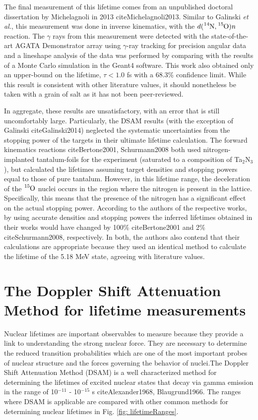 The final measurement of this lifetime comes from an unpublished doctoral dissertation by Michelagnoli in 2013 cite{Michelagnoli2013}. Similar to Galinski \textit{et al.}, this measurement was done in inverse kinematics, with the $d(\ce{^{14}N},\ce{^{15}O})n$ reaction. The $\gamma$ rays from this measurement were detected with the state-of-the-art AGATA Demonstrator array using $\gamma$-ray tracking for precision angular data and a lineshape analysis of the data was performed by comparing with the results of a Monte Carlo simulation in the Geant4 software. This work also obtained only an upper-bound on the lifetime, $\tau < 1.0$ fs with a 68.3\% confidence limit. While this result is consistent with other literature values, it should nonetheless be taken with a grain of salt as it has not been peer-reviewed. 

In aggregate, these results are unsatisfactory, with an error that is still uncomfortably large. Particularly, the DSAM results (with the exception of Galinski cite{Galinski2014}) neglected the systematic uncertainties from the stopping power of the targets in their ultimate lifetime calculation. The forward kinematics reactions cite{Bertone2001, Schurmann2008} both used nitrogen-implanted tantalum-foils for the experiment (saturated to a composition of Ta$_{2}$N$_{3}$), but calculated the lifetimes assuming target densities and stopping powers equal to those of pure tantalum. However, in this lifetime range, the deceleration of the $\ce{^{15}O}$ nuclei occurs in the region where the nitrogen is present in the lattice. Specifically, this means that the presence of the nitrogen has a significant effect on the actual stopping power. According to the authors of the respective works, by using accurate densities and stopping powers the inferred lifetimes obtained in their works would have changed by 100\% cite{Bertone2001} and 2\% cite{Schurmann2008}, respectively. In both, the authors also contend that their calculations are appropriate because they used an identical method to calculate the lifetime of the 5.18 MeV state, agreeing with literature values.



\section{The Doppler Shift Attenuation Method for lifetime measurements}
\label{sec: dsam-intro}


Nuclear lifetimes are important observables to measure because they provide a link to understanding the strong nuclear force. They are necessary to determine the reduced transition probabilities which are one of the most important probes of nuclear structure and the forces governing the behavior of nuclei.The Doppler Shift Attenuation Method (DSAM) is a well characterized method for determining the lifetimes of excited nuclear states that decay via gamma emission in the range of 10$^{-11}$ - 10$^{-15}$ s cite{Alexander1968, Blaugrund1966}. The ranges where DSAM is applicable are compared with other common methods for determining nuclear lifetimes in Fig. \ref{fig: lifetimeRanges}. 


